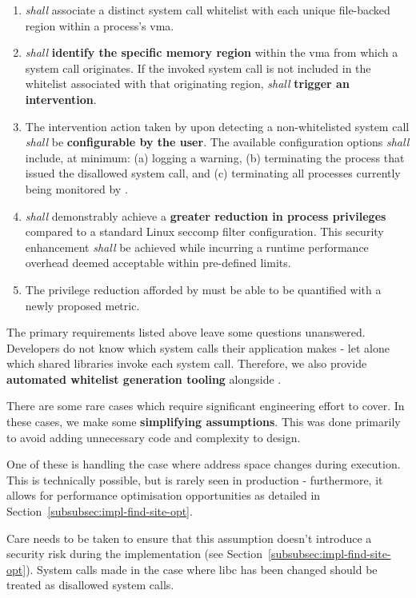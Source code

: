 \begin{enumerate}
    \item \af \textit{shall} associate a distinct system call whitelist with each unique file-backed region within a process's \ac{vma}.
    \item \af \textit{shall} \textbf{identify the specific memory region} within the \ac{vma} from which a system call originates. If the invoked system call is not included in the whitelist associated with that originating region, \af \textit{shall} \textbf{trigger an intervention}.
    \item The intervention action taken by \af upon detecting a non-whitelisted system call \textit{shall} be \textbf{configurable by the user}. The available configuration options \textit{shall} include, at minimum: (a) logging a warning, (b) terminating the process that issued the disallowed system call, and (c) terminating all processes currently being monitored by \af.
    \item \af \textit{shall} demonstrably achieve a \textbf{greater reduction in process privileges} compared to a standard Linux seccomp filter configuration. This security enhancement \textit{shall} be achieved while incurring a runtime performance overhead deemed acceptable within pre-defined limits.
    \item The privilege reduction afforded by \af must be able to be quantified
        with a newly proposed metric.
\end{enumerate}

The primary requirements listed above leave some questions unanswered.
Developers do not know which system calls their application makes - let alone
which shared libraries invoke each system call. Therefore, we also
provide \textbf{automated whitelist generation tooling} alongside \af. 

There are some rare cases which require significant engineering effort to cover.
In these cases, we make some \textbf{simplifying assumptions}. This was done
primarily to avoid adding unnecessary code and complexity to \afg design. 
 
One of these is handling the case where  address space changes during
execution. This is technically possible, but is rarely seen in production -
furthermore, it allows for performance optimisation opportunities as detailed in
Section~\ref{subsubsec:impl-find-site-opt}.

Care needs to be taken to ensure that this assumption doesn't introduce a
security risk during the implementation (see Section~\ref{subsubsec:impl-find-site-opt}). 
System calls made in the case where \ac{libc} has been changed should be
treated as disallowed system calls.

